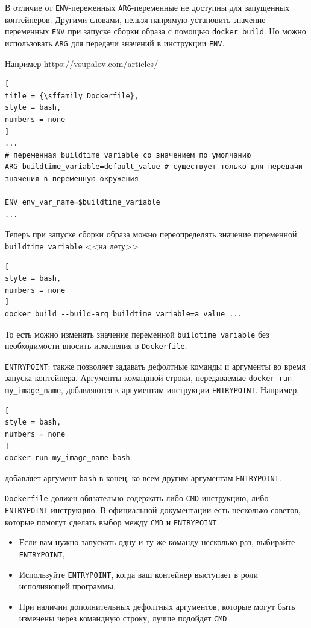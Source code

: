 \documentclass[%
	11pt,
	a4paper,
	utf8,
		]{article}
\begin{document}
В отличие от \texttt{ENV}-переменных \texttt{ARG}-переменные не доступны для запущенных контейнеров. Другими словами, нельзя напрямую установить значение переменных \texttt{ENV} при запуске сборки образа с помощью \texttt{docker build}. Но можно использовать \texttt{ARG} для передачи значений в инструкции \texttt{ENV}.

Например \url{https://vsupalov.com/articles/}
\begin{lstlisting}[
title = {\sffamily Dockerfile},
style = bash,
numbers = none	
]
...
# переменная buildtime_variable со значением по умолчанию
ARG buildtime_variable=default_value # существует только для передачи значения в переменную окружения

ENV env_var_name=$buildtime_variable
...
\end{lstlisting}

Теперь при запуске сборки образа можно переопределять значение переменной \verb|buildtime_variable| <<на лету>>
\begin{lstlisting}[
style = bash,
numbers = none	
]
docker build --build-arg buildtime_variable=a_value ...
\end{lstlisting}

То есть можно изменять значение переменной \verb|buildtime_variable| без необходимости вносить изменения в \texttt{Dockerfile}.

\texttt{ENTRYPOINT}: также позволяет задавать дефолтные команды и аргументы во время запуска контейнера. Аргументы командной строки, передаваемые \texttt{docker run my\_image\_name}, добавляются к аргументам инструкции \texttt{ENTRYPOINT}. Например,
\begin{lstlisting}[
style = bash,
numbers = none	
]
docker run my_image_name bash
\end{lstlisting}
добавляет аргумент \texttt{bash} в конец, ко всем другим аргументам \texttt{ENTRYPOINT}.

\texttt{Dockerfile} должен обязательно содержать либо \texttt{CMD}-инструкцию, либо \texttt{ENTRYPOINT}-инструкцию. В официальной документации есть несколько советов, которые помогут сделать выбор между \texttt{CMD} и \texttt{ENTRYPOINT}
\begin{itemize}
	\item Если вам нужно запускать одну и ту же команду несколько раз, выбирайте \texttt{ENTRYPOINT},
	
	\item Используйте \texttt{ENTRYPOINT}, когда ваш контейнер выступает в роли исполняющей программы,
	
	\item При наличии дополнительных дефолтных аргументов, которые могут быть изменены через командную строку, лучше подойдет \texttt{CMD}.
\end{itemize}
\end{document}
